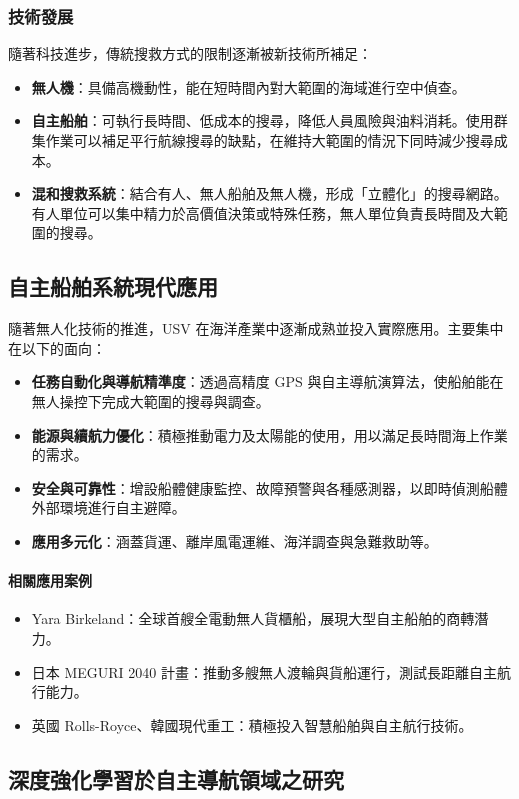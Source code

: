 \documentclass[12pt,a4paper]{ctexart}
\begin{document}
\subsubsection{技術發展}
隨著科技進步，傳統搜救方式的限制逐漸被新技術所補足：
\begin{itemize}
  \item \textbf{無人機}：具備高機動性，能在短時間內對大範圍的海域進行空中偵查。
  \item \textbf{自主船舶}：可執行長時間、低成本的搜尋，降低人員風險與油料消耗。使用群集作業可以補足平行航線搜尋的缺點，在維持大範圍的情況下同時減少搜尋成本。
  \item \textbf{混和搜救系統}：結合有人、無人船舶及無人機，形成「立體化」的搜尋網路。有人單位可以集中精力於高價值決策或特殊任務，無人單位負責長時間及大範圍的搜尋。
\end{itemize}

\subsection{自主船舶系統現代應用}
隨著無人化技術的推進，USV 在海洋產業中逐漸成熟並投入實際應用。主要集中在以下的面向：
\begin{itemize}
  \item \textbf{任務自動化與導航精準度}：透過高精度 GPS 與自主導航演算法，使船舶能在無人操控下完成大範圍的搜尋與調查。
  \item \textbf{能源與續航力優化}：積極推動電力及太陽能的使用，用以滿足長時間海上作業的需求。
  \item \textbf{安全與可靠性}：增設船體健康監控、故障預警與各種感測器，以即時偵測船體外部環境進行自主避障。
  \item \textbf{應用多元化}：涵蓋貨運、離岸風電運維、海洋調查與急難救助等。
\end{itemize}

\paragraph{相關應用案例}
\begin{itemize}
  \item Yara Birkeland：全球首艘全電動無人貨櫃船，展現大型自主船舶的商轉潛力。
  \item 日本 MEGURI 2040 計畫：推動多艘無人渡輪與貨船運行，測試長距離自主航行能力。
  \item 英國 Rolls-Royce、韓國現代重工：積極投入智慧船舶與自主航行技術。
\end{itemize}

\subsection{深度強化學習於自主導航領域之研究}
\end{document}
